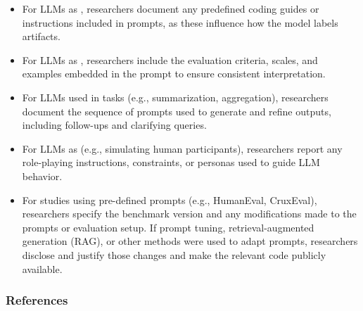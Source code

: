 \begin{itemize}
  \item For LLMs as \annotators, researchers \must document any predefined coding guides or instructions included in prompts, as these influence how the model labels artifacts.
  \item For LLMs as \judges, researchers \must include the evaluation criteria, scales, and examples embedded in the prompt to ensure consistent interpretation.
  \item For LLMs used in \synthesis tasks (e.g., summarization, aggregation), researchers \must document the sequence of prompts used to generate and refine outputs, including follow-ups and clarifying queries.
  \item For LLMs as \subjects (e.g., simulating human participants), researchers \must report any role-playing instructions, constraints, or personas used to guide LLM behavior.
  \item For \benchmarkingtasks studies using pre-defined prompts (e.g., HumanEval, CruxEval), researchers \must specify the benchmark version and any modifications made to the prompts or evaluation setup. If prompt tuning, retrieval-augmented generation (RAG), or other methods were used to adapt prompts, researchers \must disclose and justify those changes and \should make the relevant code publicly available.
\end{itemize}


\subsubsection{References}





